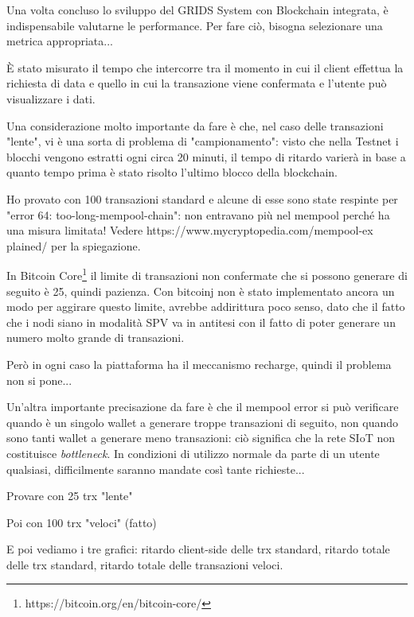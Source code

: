 Una volta concluso lo sviluppo del GRIDS System con Blockchain integrata, è indispensabile valutarne le performance.
Per fare ciò, bisogna selezionare una metrica appropriata...


È stato misurato il tempo che intercorre tra il momento in cui il client effettua la richiesta di data e quello in cui la transazione viene confermata e l'utente può visualizzare i dati.

Una considerazione molto importante da fare è che, nel caso delle transazioni "lente", vi è una sorta di problema di "campionamento": visto che nella Testnet i blocchi vengono estratti ogni circa 20 minuti, il tempo di ritardo varierà in base a quanto tempo prima è stato risolto l'ultimo blocco della blockchain.

Ho provato con 100 transazioni standard e alcune di esse sono state respinte per "error 64: too-long-mempool-chain": non entravano più nel mempool perché ha una misura limitata! Vedere https://www.mycryptopedia.com/mempool-ex plained/ per la spiegazione.

In Bitcoin Core\footnote{https://bitcoin.org/en/bitcoin-core/} il limite di transazioni non confermate che si possono generare di seguito è 25, quindi pazienza. Con bitcoinj non è stato implementato ancora un modo per aggirare questo limite, avrebbe addirittura poco senso, dato che il fatto che i nodi siano in modalità SPV va in antitesi con il fatto di poter generare un numero molto grande di transazioni.

Però in ogni caso la piattaforma ha il meccanismo recharge, quindi il problema non si pone...

Un'altra importante precisazione da fare è che il mempool error si può verificare quando è un singolo wallet a generare troppe transazioni di seguito, non quando sono tanti wallet a generare meno transazioni: ciò significa che la rete SIoT non costituisce \textit{bottleneck}. In condizioni di utilizzo normale da parte di un utente qualsiasi, difficilmente saranno mandate così tante richieste...

Provare con 25 trx "lente"

Poi con 100 trx "veloci" (fatto)

E poi vediamo i tre grafici: ritardo client-side delle trx standard, ritardo totale delle trx standard, ritardo totale delle transazioni veloci.


